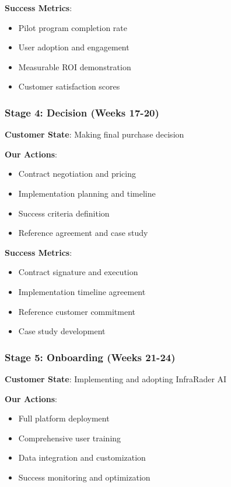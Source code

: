 \documentclass[business]{../templates/infraradar-main}
\begin{document}
\textbf{Success Metrics}:
\begin{itemize}
    \item Pilot program completion rate
    \item User adoption and engagement
    \item Measurable ROI demonstration
    \item Customer satisfaction scores
\end{itemize}

\subsubsection{Stage 4: Decision (Weeks 17-20)}
\textbf{Customer State}: Making final purchase decision

\textbf{Our Actions}:
\begin{itemize}
    \item Contract negotiation and pricing
    \item Implementation planning and timeline
    \item Success criteria definition
    \item Reference agreement and case study
\end{itemize}

\textbf{Success Metrics}:
\begin{itemize}
    \item Contract signature and execution
    \item Implementation timeline agreement
    \item Reference customer commitment
    \item Case study development
\end{itemize}

\subsubsection{Stage 5: Onboarding (Weeks 21-24)}
\textbf{Customer State}: Implementing and adopting InfraRader AI

\textbf{Our Actions}:
\begin{itemize}
    \item Full platform deployment
    \item Comprehensive user training
    \item Data integration and customization
    \item Success monitoring and optimization
\end{itemize}
\end{document}
